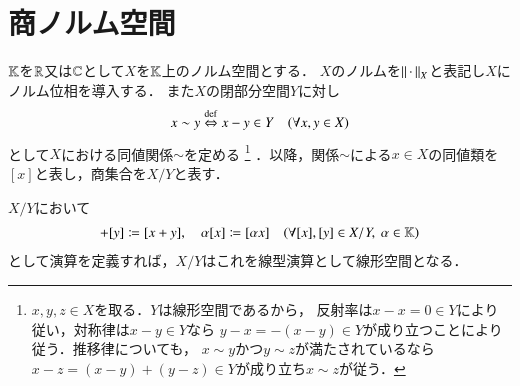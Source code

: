 \chapter{商ノルム空間}
	$\mathbb{K}$を$\mathbb{R}$又は$\mathbb{C}$として$X$を$\mathbb{K}$上のノルム空間とする．
	$X$のノルムを$\left\|\, \cdot\, \right\|_{X}$と表記し$X$にノルム位相を導入する．
	また$X$の閉部分空間$Y$に対し
	\begin{align}
		x \sim y \overset{\mathrm{def}}{\Leftrightarrow} x - y \in Y \quad (\forall x,y \in X)
	\end{align}
	として$X$における同値関係$\sim$を定める
	\footnote{
		$x,y,z \in X$を取る．$Y$は線形空間であるから，
		反射率は$x - x = 0 \in Y$により従い，対称律は$x - y \in Y$なら
		$y - x = -(x - y) \in Y$が成り立つことにより従う．推移律についても，
		$x \sim y$かつ$y \sim z$が満たされているなら
		$x - z = (x - y) + (y - z) \in Y$が成り立ち$x \sim z$が従う．
	}
	．以降，関係$\sim$による$x \in X$の同値類を$[x]$と表し，商集合を$X/Y$と表す．
	
	\begin{screen}
		\begin{thm}[商集合における線型演算]
			$X/Y$において
			\begin{align}
				[x] + [y] \coloneqq [x + y], \quad
				\alpha [x] \coloneqq [\alpha x] \quad (\forall [x],[y] \in X/Y,\ \alpha \in \K)
				\label{eq:quotient_set_linear_calculation_1}
			\end{align}
			として演算を定義すれば，$X/Y$はこれを線型演算として線形空間となる．
		\end{thm}
	\end{screen}
	
